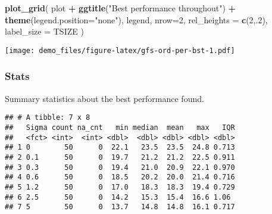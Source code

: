 \documentclass[]{book}
\newenvironment{Shaded}{\begin{snugshade}}{\end{snugshade}}
\newcommand{\DataTypeTok}[1]{\textcolor[rgb]{0.13,0.29,0.53}{#1}}
\newcommand{\DecValTok}[1]{\textcolor[rgb]{0.00,0.00,0.81}{#1}}
\newcommand{\KeywordTok}[1]{\textcolor[rgb]{0.13,0.29,0.53}{\textbf{#1}}}
\newcommand{\NormalTok}[1]{#1}
\newcommand{\OperatorTok}[1]{\textcolor[rgb]{0.81,0.36,0.00}{\textbf{#1}}}
\newcommand{\OtherTok}[1]{\textcolor[rgb]{0.56,0.35,0.01}{#1}}
\newcommand{\StringTok}[1]{\textcolor[rgb]{0.31,0.60,0.02}{#1}}
\begin{document}
\begin{Shaded}
\begin{Highlighting}[]
\KeywordTok{plot_grid}\NormalTok{(}
\NormalTok{  plot }\OperatorTok{+}
\StringTok{    }\KeywordTok{ggtitle}\NormalTok{(}\StringTok{"Best performance throughout"}\NormalTok{) }\OperatorTok{+}
\StringTok{    }\KeywordTok{theme}\NormalTok{(}\DataTypeTok{legend.position=}\StringTok{"none"}\NormalTok{),}
\NormalTok{  legend,}
  \DataTypeTok{nrow=}\DecValTok{2}\NormalTok{,}
  \DataTypeTok{rel_heights =} \KeywordTok{c}\NormalTok{(}\DecValTok{2}\NormalTok{,.}\DecValTok{2}\NormalTok{),}
  \DataTypeTok{label_size =}\NormalTok{ TSIZE}
\NormalTok{)}
\end{Highlighting}
\end{Shaded}

\texttt{[image: demo\_files/figure-latex/gfs-ord-per-bst-1.pdf]}

\hypertarget{stats-42}{%
\subsubsection{Stats}\label{stats-42}}

Summary statistics about the best performance found.

\begin{Shaded}
\end{Shaded}

\begin{verbatim}
## # A tibble: 7 x 8
##   Sigma count na_cnt   min median  mean   max   IQR
##   <fct> <int>  <int> <dbl>  <dbl> <dbl> <dbl> <dbl>
## 1 0        50      0  22.1   23.5  23.5  24.8 0.713
## 2 0.1      50      0  19.7   21.2  21.2  22.5 0.911
## 3 0.3      50      0  19.4   21.0  20.9  22.1 0.970
## 4 0.6      50      0  18.5   20.2  20.0  21.4 0.716
## 5 1.2      50      0  17.0   18.3  18.3  19.4 0.729
## 6 2.5      50      0  14.2   15.3  15.4  16.6 1.06 
## 7 5        50      0  13.7   14.8  14.8  16.1 0.717
\end{verbatim}
\end{document}
